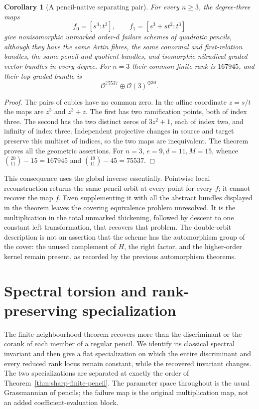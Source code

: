 \documentclass[11pt,reqno]{amsart}
\numberwithin{equation}{section}
\newtheorem{corollary}[theorem]{Corollary}
\theoremstyle{definition}\newtheorem{definition}[theorem]{Definition}
\theoremstyle{remark}\newtheorem{remark}[theorem]{Remark}
\newcommand{\OO}{\mathcal O}\newcommand{\II}{\mathcal I}
\begin{document}
\begin{corollary}[A pencil-native separating pair]
\label{cor:pencil-native-pair-v148}
For every \(n\ge3\), the degree-three maps
\[
          f_0=[s^3:t^3],\qquad f_1=[s^3+st^2:t^3]
\]
give nonisomorphic unmarked order-\(d\) failure schemes of
quadratic pencils, although they have the same Artin fibres, the
same conormal and first-relation bundles, the same pencil and
quotient bundles, and isomorphic nilradical graded vector bundles
in every degree.  For \(n=3\) their common finite rank is
\(167945\), and their top graded bundle is
\[
                  \OO^{75537}\oplus\OO(3)^{\oplus30}.
\]
\end{corollary}
\begin{proof}
The pairs of cubics have no common zero.  In the affine coordinate
\(z=s/t\) the maps are \(z^3\) and \(z^3+z\).
The first has two ramification points, both of index three.
The second has the two distinct zeros of \(3z^2+1\), each of
index two, and infinity of index three.  Independent projective
changes in source and target preserve this multiset of indices,
so the two maps are inequivalent.  The theorem proves all the
geometric assertions.  For \(n=3\),
\(e=9,d=11,M=15\), whence
\(\binom{20}{11}-15=167945\) and
\(\binom{19}{11}-45=75537\).
\end{proof}

This consequence uses the global inverse essentially.  Pointwise
local reconstruction returns the same pencil orbit at every
point for every \(f\); it cannot recover the map \(f\).
Even supplementing it with all the abstract bundles displayed in
the theorem leaves the covering equivalence problem unresolved.
It is the multiplication in the total unmarked thickening,
followed by descent to one constant left transformation, that
recovers that problem.  The double-orbit description is not an
assertion that the scheme has the automorphism group of the
cover: the unused complement of \(H\), the right factor, and
the higher-order kernel remain present, as recorded by the
previous automorphism theorems.


\section{Spectral torsion and rank-preserving specialization}
\label{sec:spectral-specialization}

The finite-neighbourhood theorem recovers more than the discriminant
or the corank of each member of a regular pencil.  We identify its
classical spectral invariant and then give a flat specialization on
which the entire discriminant and every reduced rank locus remain
constant, while the recovered invariant changes.  The two specializations
are separated at exactly the order of Theorem~\ref{thm:sharp-finite-pencil}.
The parameter space throughout is the usual Grassmannian of pencils;
the failure map is the original multiplication map, not an added
coefficient-evaluation block.
\end{document}
